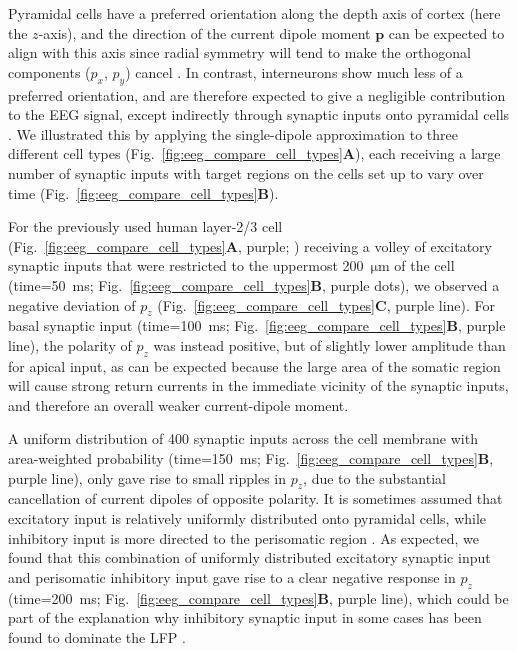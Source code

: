 \documentclass[preprint,10pt,authoryear]{elsarticle}
\newcommand{\hlp}[2][Purple]{ {\sethlcolor{#1} \hl{#2}} }
\newcommand{\gen}[1]{\color{white}{\hlp{GTE: #1 }}\color{black}}
\begin{document}
Pyramidal cells have a preferred orientation along the depth axis of cortex (here the $z$-axis), and the direction of the current dipole moment $\mathbf{p}$ can be expected to align with this axis since
radial symmetry will tend to make the orthogonal components ($p_x$, $p_y$) cancel \citep{HAGEN2018}. 
In contrast, interneurons show much less of a preferred orientation, and are therefore expected to give a negligible contribution to the EEG signal, except indirectly through synaptic inputs onto pyramidal cells \citep{HAGEN2016}.
We illustrated this by applying the single-dipole approximation to three different cell types (Fig.~\ref{fig:eeg_compare_cell_types}\textbf{A}), each receiving a large number of synaptic inputs with target regions on the cells set up to vary over time (Fig.~\ref{fig:eeg_compare_cell_types}\textbf{B}).

For the previously used human layer-2/3 cell (Fig.~\ref{fig:eeg_compare_cell_types}\textbf{A}, purple; \cite{EYAL2016})
receiving a volley of excitatory synaptic inputs that were restricted to the uppermost 200~$\si{\um}$ of the cell (time=50~ms; Fig.~\ref{fig:eeg_compare_cell_types}\textbf{B}, purple dots), we observed a negative deviation of $p_z$ (Fig.~\ref{fig:eeg_compare_cell_types}\textbf{C}, purple line). For basal synaptic input (time=100~ms; Fig.~\ref{fig:eeg_compare_cell_types}\textbf{B}, purple line), the polarity of $p_z$ was instead positive, but of slightly lower amplitude than for apical input, as can be expected because the large area of the somatic region will cause strong return currents in the immediate vicinity of the synaptic inputs, and therefore an overall weaker current-dipole moment.


A uniform distribution of 400 synaptic inputs across the cell membrane with area-weighted probability (time=150~ms; Fig.~\ref{fig:eeg_compare_cell_types}\textbf{B}, purple line), only gave rise to small ripples in $p_z$, due to the substantial cancellation of current dipoles of opposite polarity. It is sometimes assumed that excitatory input is relatively uniformly distributed onto pyramidal cells, while inhibitory input is more directed to the perisomatic region \citep{Mazzoni2015, Telenczuk2019, Skaar2020, Telenczuk2020}. As expected, we found that this combination of uniformly distributed excitatory synaptic input and perisomatic inhibitory input gave rise to a clear negative response in $p_z$ (time=200~ms; Fig.~\ref{fig:eeg_compare_cell_types}\textbf{B}, purple line), which could be part of the explanation why inhibitory synaptic input in some cases has been found to dominate the LFP \citep{HAGEN2016, TELENCZUK2016}.
\end{document}
